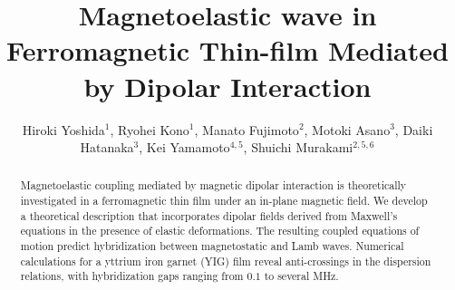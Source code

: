 \documentclass[10pt]{iopart}
\begin{document}
\title{Magnetoelastic wave in Ferromagnetic Thin-film Mediated by Dipolar Interaction}

\author{Hiroki Yoshida$^1$, Ryohei Kono$^1$, Manato Fujimoto$^2$, Motoki Asano$^3$, Daiki Hatanaka$^3$, Kei Yamamoto$^{4,5}$, Shuichi Murakami$^{2,5,6}$}
\address{$^1$ Department of Physics, Institute of Science Tokyo, 2-12-1 Ookayama, Meguro-ku, Tokyo 152-8551, Japan}
\address{$^2$ Department of Applied Physics, The University of Tokyo, 7-3-1 Hongo, Bunkyo-ku, Tokyo 113-8656, Japan}
\address{$^3$ Basic Research Laboratories, NTT, Inc., 3-1 Morinosato-Wakamiya, Atsugi-shi, Kanagawa 243-0198, Japan}
\address{$^4$ Advanced Science Research Center, Japan Atomic Energy Agency, Tokai, Ibaraki 319-1195, Japan}
\address{$^5$ Center for Emergent Matter Science, RIKEN, 2-1 Hirosawa, Wako, Saitama 351-0198, Japan}
\address{$^6$ International Institute for Sustainability with Knotted Chiral Meta Matter (WPI-SKCM$^2$), Hiroshima University, Higashi-hiroshima, Hiroshima 739-0046, Japan}


\begin{abstract}
    Magnetoelastic coupling mediated by magnetic dipolar interaction is theoretically investigated in a ferromagnetic thin film under an in-plane magnetic field. We develop a theoretical description that incorporates dipolar fields derived from Maxwell's equations in the presence of elastic deformations. The resulting coupled equations of motion predict hybridization between magnetostatic and Lamb waves. Numerical calculations for a yttrium iron garnet (YIG) film reveal anti-crossings in the dispersion relations, with hybridization gaps ranging from $0.1$ to several MHz.
\end{abstract}

\submitto{\APEX}
\maketitle
\ioptwocol
\end{document}
